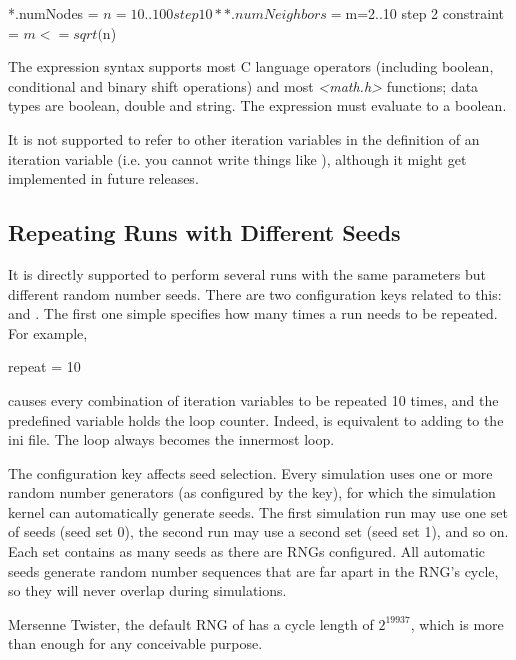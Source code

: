 \begin{inifile}
*.numNodes = ${n=10..100 step 10}
**.numNeighbors = ${m=2..10 step 2}
constraint = $m <= sqrt($n)
\end{inifile}

The expression syntax supports most C language operators (including
boolean, conditional and binary shift operations) and most
\textit{<math.h>} functions; data types are boolean,
double and string. The expression must evaluate to a boolean.

\begin{note}
    It is not supported to refer to other iteration variables
    in the definition of an iteration variable (i.e. you cannot write
    things like ), although it might get implemented in
    future {\opp} releases.
\end{note}

\subsection{Repeating Runs with Different Seeds}

It is directly supported to perform several runs with the same
parameters but different random number seeds. There are two
configuration keys related to this:  and . The first
one simple specifies how many times a run needs to be repeated. For
example,

\begin{inifile}
repeat = 10
\end{inifile}

causes every combination of iteration variables to be repeated 10 times,
and the  predefined variable holds the loop counter.
Indeed,  is equivalent to adding 
to the ini file. The  loop always becomes the innermost loop.

The  configuration key affects seed selection. Every
simulation uses one or more random number generators (as configured by
the  key), for which the simulation kernel can automatically
generate seeds. The first simulation run may use one set of seeds (seed
set 0), the second run may use a second set (seed set 1), and so on.
Each set contains as many seeds as there are RNGs configured. All
automatic seeds generate random number sequences that are far apart in
the RNG's cycle, so they will never overlap during
simulations.

\begin{note}
Mersenne Twister, the default RNG of {\opp} has a cycle length of
$2^{19937}$, which is more than enough for any conceivable purpose.
\end{note}


